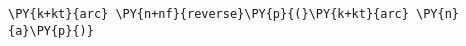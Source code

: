 \begin{Verbatim}[commandchars=\\\{\}]
    \PY{k+kt}{arc} \PY{n+nf}{reverse}\PY{p}{(}\PY{k+kt}{arc} \PY{n}{a}\PY{p}{)}
\end{Verbatim}
